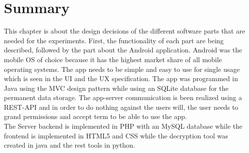 \section{Summary}
This chapter is about the design decisions of the different software parts that are needed for the experiments. First, the functionality of each part are being described, followed by the part about the Android application. Android was the mobile OS of choice because it has the highest market share of all mobile operating systems. The app needs to be simple and easy to use for single usage which is seen in the UI and the UX specification. 
The app was programmed in Java using the MVC design pattern while using an SQLite database for the permanent data storage. The app-server communication is been realized using a REST-API and in order to do nothing against the users will, the user needs to grand permissions and accept term to be able to use the app. \\
The Server backend is implemented in PHP with an MySQL database while the frontend is implemented in HTML5 and CSS while the decryption tool was created in java and the rest tools in python. 